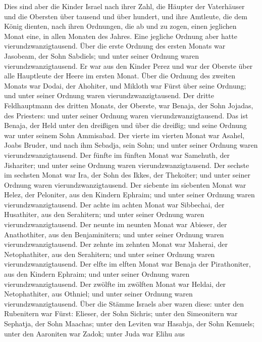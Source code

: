  Dies sind aber die Kinder Israel nach ihrer Zahl, die
Häupter der Vaterhäuser und die Obersten über tausend und über hundert,
und ihre Amtleute, die dem König dienten, nach ihren Ordnungen, die ab
und zu zogen, einen jeglichen Monat eine, in allen Monaten des Jahres.
Eine jegliche Ordnung aber hatte vierundzwanzigtausend. 
Über die erste Ordnung des ersten Monats war Jasobeam, der Sohn
Sabdiels; und unter seiner Ordnung waren vierundzwanzigtausend.
 Er war aus den Kinder Perez und war der Oberste über alle
Hauptleute der Heere im ersten Monat.  Über die Ordnung des
zweiten Monats war Dodai, der Ahohiter, und Mikloth war Fürst über seine
Ordnung; und unter seiner Ordnung waren vierundzwanzigtausend.
 Der dritte Feldhauptmann des dritten Monats, der Oberste,
war Benaja, der Sohn Jojadas, des Priesters: und unter seiner Ordnung
waren vierundzwanzigtausend.  Das ist Benaja, der Held unter
den dreißigen und über die dreißig; und seine Ordnung war unter seinem
Sohn Ammisabad.  Der vierte im vierten Monat war Asahel,
Joabs Bruder, und nach ihm Sebadja, sein Sohn; und unter seiner Ordnung
waren vierundzwanzigtausend.  Der fünfte im fünften Monat
war Samehuth, der Jishariter; und unter seine Ordnung waren
vierundzwanzigtausend.  Der sechste im sechsten Monat war
Ira, der Sohn des Ikkes, der Thekoiter; und unter seiner Ordnung waren
vierundzwanzigtausend.  Der siebente im siebenten Monat war
Helez, der Peloniter, aus den Kindern Ephraim; und unter seiner Ordnung
waren vierundzwanzigtausend.  Der achte im achten Monat war
Sibbechai, der Husathiter, aus den Serahitern; und unter seiner Ordnung
waren vierundzwanzigtausend.  Der neunte im neunten Monat
war Abieser, der Anathothiter, aus den Benjaminitern; und unter seiner
Ordnung waren vierundzwanzigtausend.  Der zehnte im zehnten
Monat war Maherai, der Netophathiter, aus den Serahitern; und unter
seiner Ordnung waren vierundzwanzigtausend.  Der elfte im
elften Monat war Benaja der Pirathoniter, aus den Kindern Ephraim; und
unter seiner Ordnung waren vierundzwanzigtausend.  Der
zwölfte im zwölften Monat war Heldai, der Netophathiter, aus Othniel;
und unter seiner Ordnung waren vierundzwanzigtausend.  Über
die Stämme Israels aber waren diese: unter den Rubenitern war Fürst:
Elieser, der Sohn Sichris; unter den Simeonitern war Sephatja, der Sohn
Maachas;  unter den Leviten war Hasabja, der Sohn Kemuels;
unter den Aaroniten war Zadok;  unter Juda war Elihu aus
